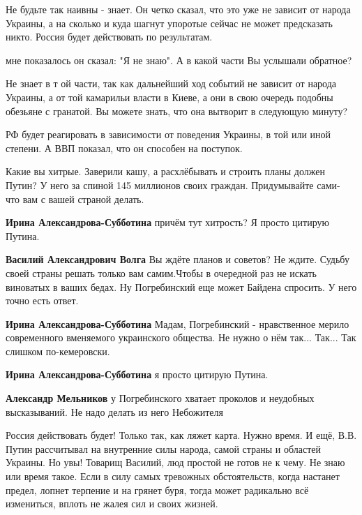 \begin{itemize}
Не будьте так наивны - знает. Он четко сказал, что это уже не зависит от народа
Украины, а на сколько и куда шагнут упоротые сейчас не может предсказать никто.
Россия будет действовать по результатам.

\begin{itemize} %
мне показалось он сказал: "Я не знаю". А в какой части Вы услышали обратное?

Не знает в т ой части, так как дальнейший ход событий не зависит от народа Украины, а от той камарильи власти в Киеве, а они в свою очередь подобны обезьяне с гранатой. Вы можете знать, что она вытворит в следующую минуту?

РФ будет реагировать в зависимости от поведения Украины, в той или иной степени. А ВВП показал, что он способен на поступок.
\end{itemize} %


Какие вы хитрые. Заверили кашу, а расхлёбывать и строить планы должен Путин? У
него за спиной 145 миллионов своих граждан. Придумывайте сами- что вам с вашей
страной делать.

\begin{itemize} %
\textbf{Ирина Александрова-Субботина} причём тут хитрость? Я просто цитирую Путина.

\textbf{Василий Александрович Волга} Вы ждёте планов и советов? Не ждите. Судьбу своей страны решать только вам самим.Чтобы в очередной раз не искать виноватых в ваших бедах. Ну Погребинский еще может Байдена спросить. У него точно есть ответ.

\textbf{Ирина Александрова-Субботина} Мадам, Погребинский - нравственное мерило современного вменяемого украинского общества. Не нужно о нём так... Так... Так слишком по-кемеровски.

\textbf{Ирина Александрова-Субботина} я просто цитирую Путина.

\textbf{Александр Мельников} у Погребинского хватает проколов и неудобных высказываний. Не надо делать из него Небожителя
\end{itemize} %


Россия действовать будет! Только так, как ляжет карта. Нужно время. И ещё, В.В.
Путин рассчитывал на внутренние силы народа, самой страны и областей Украины.
Но увы! Товарищ Василий, люд простой не готов не к чему. Не знаю или время
такое. Если в силу самых тревожных обстоятельств, когда настанет предел, лопнет
терпение и на грянет буря, тогда может радикально всё измениться, вплоть не
жалея сил и своих жизней.


\end{itemize}
